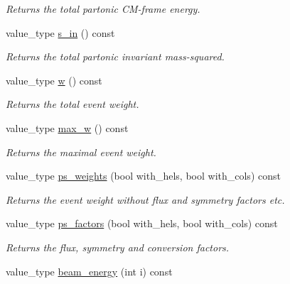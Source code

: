 \begin{DoxyCompactItemize}
\begin{DoxyCompactList}\small\item\em Returns the total partonic C\+M-\/frame energy. \end{DoxyCompactList}\item 
\hypertarget{a00436_ab387d873d60cc166023d4687a09c282f}{}value\+\_\+type \hyperlink{a00436_ab387d873d60cc166023d4687a09c282f}{s\+\_\+in} () const \label{a00436_ab387d873d60cc166023d4687a09c282f}

\begin{DoxyCompactList}\small\item\em Returns the total partonic invariant mass-\/squared. \end{DoxyCompactList}\item 
\hypertarget{a00436_ad8f5784273d95bcea8ef4e61cff3bc3e}{}value\+\_\+type \hyperlink{a00436_ad8f5784273d95bcea8ef4e61cff3bc3e}{w} () const \label{a00436_ad8f5784273d95bcea8ef4e61cff3bc3e}

\begin{DoxyCompactList}\small\item\em Returns the total event weight. \end{DoxyCompactList}\item 
\hypertarget{a00436_a7e6ff5ed5c6e4b0774bfd5067cc5a54e}{}value\+\_\+type \hyperlink{a00436_a7e6ff5ed5c6e4b0774bfd5067cc5a54e}{max\+\_\+w} () const \label{a00436_a7e6ff5ed5c6e4b0774bfd5067cc5a54e}

\begin{DoxyCompactList}\small\item\em Returns the maximal event weight. \end{DoxyCompactList}\item 
value\+\_\+type \hyperlink{a00436_ad5df91b2c5e630adc9e59b499ded970f}{ps\+\_\+weights} (bool with\+\_\+hels, bool with\+\_\+cols) const 
\begin{DoxyCompactList}\small\item\em Returns the event weight without flux and symmetry factors etc. \end{DoxyCompactList}\item 
value\+\_\+type \hyperlink{a00436_ad13dc7c85318802813697cdeeeee0e57}{ps\+\_\+factors} (bool with\+\_\+hels, bool with\+\_\+cols) const 
\begin{DoxyCompactList}\small\item\em Returns the flux, symmetry and conversion factors. \end{DoxyCompactList}\item 
\hypertarget{a00436_acea9c82d86081354dfa1db7bbf2a86da}{}value\+\_\+type \hyperlink{a00436_acea9c82d86081354dfa1db7bbf2a86da}{beam\+\_\+energy} (int i) const \label{a00436_acea9c82d86081354dfa1db7bbf2a86da}


\end{DoxyCompactItemize}
